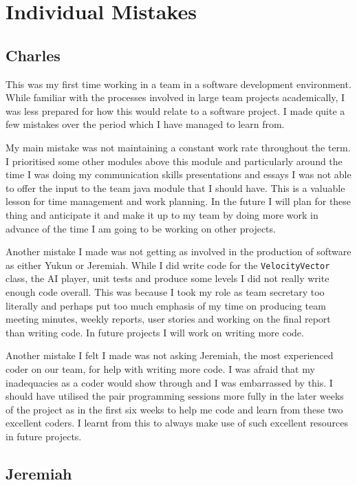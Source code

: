 \section{Individual Mistakes}

\subsection{Charles}

This was my first time working in a team in a software development
environment. While familiar with the processes involved in large team
projects academically, I was less prepared for how this would relate
to a software project. I made quite a few mistakes over the period
which I have managed to learn from.

My main mistake was not maintaining a constant work rate throughout
the term. I prioritised some other modules above this module and
particularly around the time I was doing my communication skills
presentations and essays I was not able to offer the input to the team
java module that I should have. This is a valuable lesson for time
management and work planning. In the future I will plan for these
thing and anticipate it and make it up to my team by doing more work
in advance of the time I am going to be working on other projects.

Another mistake I made was not getting as involved in the production
of software as either Yukun or Jeremiah. While I did write code for
the \texttt{VelocityVector} class, the AI player, unit tests and
produce some levels I did not really write enough code overall. This
was because I took my role as team secretary too literally and perhaps
put too much emphasis of my time on producing team meeting minutes,
weekly reports, user stories and working on the final report than
writing code. In future projects I will work on writing more code.

Another mistake I felt I made was not asking Jeremiah, the most
experienced coder on our team, for help with writing more code. I was
afraid that my inadequacies as a coder would show through and I was
embarrassed by this. I should have utilised the pair programming
sessions more fully in the later weeks of the project as in the first
six weeks to help me code and learn from these two excellent coders. I
learnt from this to always make use of such excellent resources in
future projects.

\subsection{Jeremiah}

